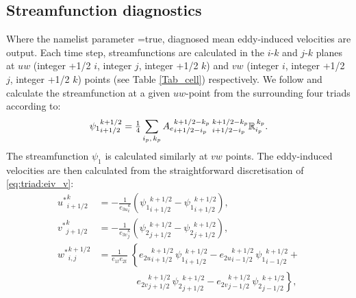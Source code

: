 \documentclass[NEMO_book]{subfiles}
\begin{document}
\subsection{Streamfunction diagnostics}\label{sec:triad:sfdiag}
Where the namelist parameter =true, diagnosed
mean eddy-induced velocities are output. Each time step,
streamfunctions are calculated in the $i$-$k$ and $j$-$k$ planes at
$uw$ (integer +1/2 $i$, integer $j$, integer +1/2 $k$) and $vw$
(integer $i$, integer +1/2 $j$, integer +1/2 $k$) points (see Table
\ref{Tab_cell}) respectively. We follow \citep{Griffies_Bk04} and
calculate the streamfunction at a given $uw$-point from the
surrounding four triads according to:
\begin{equation}
  \label{eq:triad:sfdiagi}
  {\psi_1}_{i+1/2}^{k+1/2}={\textstyle\frac{1}{4}}\sum_{\substack{i_p,\,k_p}}
  {A_e}_{i+1/2-i_p}^{k+1/2-k_p}\:{}_{i+1/2-i_p}^{k+1/2-k_p}{\mathbb{R}}_{i_p}^{\,k_p}.
\end{equation}
The streamfunction $\psi_1$ is calculated similarly at $vw$ points.
The eddy-induced velocities are then calculated from the
straightforward discretisation of \eqref{eq:triad:eiv_v}:
\begin{equation}\label{eq:triad:eiv_v_discrete}
\begin{split}
 {u^*}_{i+1/2}^{k} & = - \frac{1}{{e_{3u}}_{i}^{k}}\left({\psi_1}_{i+1/2}^{k+1/2}-{\psi_1}_{i+1/2}^{k+1/2}\right),   \\
 {v^*}_{j+1/2}^{k} & = - \frac{1}{{e_{3v}}_{j}^{k}}\left({\psi_2}_{j+1/2}^{k+1/2}-{\psi_2}_{j+1/2}^{k+1/2}\right),   \\
 {w^*}_{i,j}^{k+1/2} & =    \frac{1}{e_{1t}e_{2t}}\; \left\{
 {e_{2u}}_{i+1/2}^{k+1/2} \,{\psi_1}_{i+1/2}^{k+1/2} -
 {e_{2u}}_{i-1/2}^{k+1/2} \,{\psi_1}_{i-1/2}^{k+1/2} \right. + \\
\phantom{=} & \qquad\qquad\left. {e_{2v}}_{j+1/2}^{k+1/2} \,{\psi_2}_{j+1/2}^{k+1/2} - {e_{2v}}_{j-1/2}^{k+1/2} \,{\psi_2}_{j-1/2}^{k+1/2} \right\},
\end{split}
\end{equation}
\end{document}
